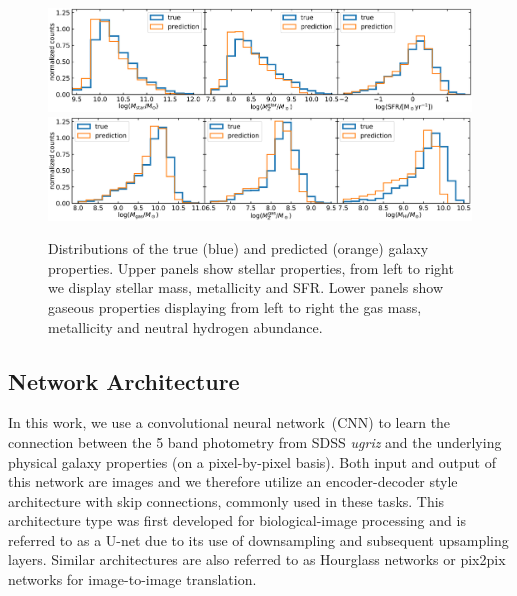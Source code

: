\documentclass[conference]{IEEEtran}
\begin{document}
\begin{figure}
\begin{center}
\includegraphics[width=\textwidth]{./plots/star_hist_2rh_masked_ugriz.pdf}
\includegraphics[width=\textwidth]{./plots/gas_hist_2rh_masked_ugriz.pdf}
\end{center}
\vspace{-.35cm}
\caption{Distributions of the true (blue) and predicted (orange) galaxy properties. Upper panels show stellar properties, from left to right we display stellar mass, metallicity and SFR. Lower panels show gaseous properties displaying from left to right the gas mass, metallicity and neutral hydrogen abundance.}
\label{fig:hist}
\end{figure}


\subsection{Network Architecture}

In this work, we use a convolutional neural network~(CNN) to learn the connection between the 5 band photometry from SDSS \textit{ugriz} and the underlying physical galaxy properties (on a pixel-by-pixel basis). Both input and output of this network are images and we therefore utilize an encoder-decoder style architecture with skip connections, commonly used in these tasks. This architecture type was first developed for biological-image  processing\citep{Ronneberger2015} and is referred to as a U-net due to its use of downsampling and subsequent upsampling layers. Similar architectures are also referred to as Hourglass networks \cite{newell2016stacked} or pix2pix networks \cite{isola2017image} for image-to-image translation.
\end{document}
